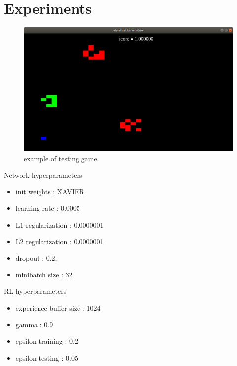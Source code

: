 \documentclass[10pt,a4paper]{article}
\begin{document}
\newpage
\section{Experiments}

\begin{figure}[!htb]
  \centering
  \includegraphics[scale=0.25]{../../diagrams/arcade_obstacles.png}
  \caption{example of testing game}
  \label{img:dqn_test_game}
\end{figure}

Network hyperparameters
\begin{itemize}
  \item init weights  : XAVIER
  \item learning rate : 0.0005
  \item L1 regularization : 0.0000001
  \item L2 regularization : 0.0000001
  \item dropout           : 0.2,
  \item minibatch size    : 32
\end{itemize}

RL hyperparameters
\begin{itemize}
  \item experience buffer size  : 1024
  \item gamma : 0.9
  \item epsilon training : 0.2
  \item epsilon testing : 0.05
\end{itemize}
\end{document}
